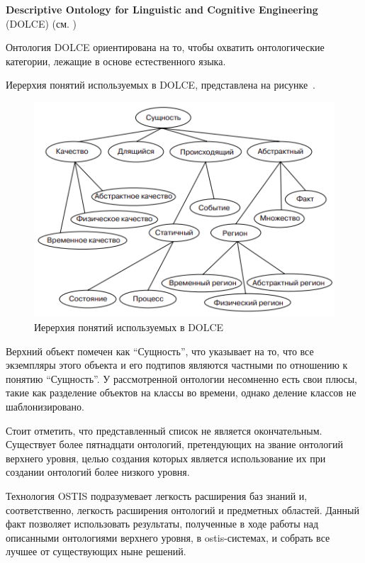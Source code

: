 \begin{textitemize}
\item{\textbf{Descriptive Ontology for Linguistic and Cognitive Engineering} (DOLCE) (см. )}
\end{textitemize}

Онтология DOLCE ориентирована на то, чтобы охватить онтологические категории, лежащие в основе естественного языка.

Иерерхия понятий используемых в DOLCE, представлена на рисунке~\textit{}.

\begin{figure}[H]
	\includegraphics[scale=0.6]{author/part2/figures/chapter_kb/dolce.png}
	\caption{Иерерхия понятий используемых в DOLCE}
	\label{fig:dolce}
\end{figure}

Верхний объект помечен как ``Сущность'', что указывает на то, что все экземпляры этого объекта и его подтипов являются частными по отношению к понятию ``Сущность''. У рассмотренной онтологии несомненно есть свои плюсы, такие как разделение объектов на классы во времени, однако деление классов не шаблонизировано. 

Стоит отметить, что представленный список не является окончательным. Существует более пятнадцати онтологий, претендующих на звание онтологий верхнего уровня, целью создания которых является использование их при создании онтологий более низкого уровня.

Технология OSTIS подразумевает легкость расширения баз знаний и, соответственно, легкость расширения онтологий и предметных областей. Данный факт позволяет использовать результаты, полученные в ходе работы над описанными онтологиями верхнего уровня, в ostis-системах, и собрать все лучшее от существующих ныне решений.

